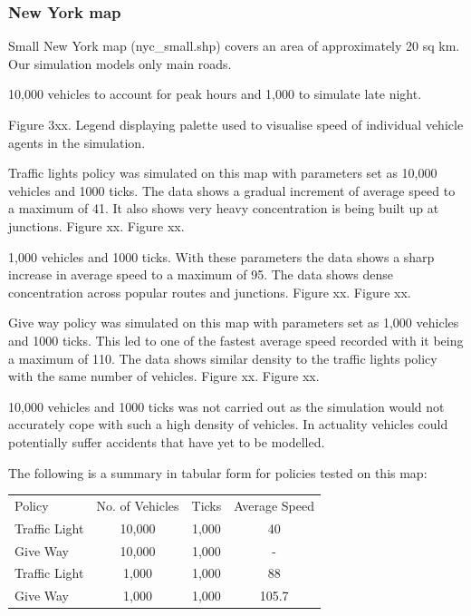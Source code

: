 \documentclass[11pt]{article}
\begin{document}
\begin{enumerate}
\subsubsection{New York map}


Small New York map (nyc\_small.shp) covers an area of approximately 20 sq km. Our simulation models only main roads. 

10,000 vehicles to account for peak hours and 1,000 to simulate late night.


Figure 3xx. Legend displaying palette used to visualise speed of individual vehicle agents in the simulation.

Traffic lights policy was simulated on this map with parameters set as 10,000 vehicles and 1000 ticks. The data shows a gradual increment of average speed to a maximum of 41. It also shows very heavy concentration is being built up at junctions.
Figure xx.
Figure xx.

1,000 vehicles and 1000 ticks. With these parameters the data shows a sharp increase in average speed to a maximum of 95. The data shows dense concentration across popular routes and junctions.
Figure xx.
Figure xx.

Give way policy was simulated on this map with parameters set as 1,000 vehicles and 1000 ticks. This led to one of the fastest average speed recorded with it being a maximum of 110. The data shows similar density to the traffic lights policy with the same number of vehicles.
Figure xx.
Figure xx.

10,000 vehicles and 1000 ticks was not carried out as the simulation would not accurately cope with such a high density of vehicles. In actuality vehicles could potentially suffer accidents that have yet to be modelled. 

The following is a summary in tabular form for policies tested on this map:


\begin{center}
\begin{tabular}{ l | c | c | c }
\hline
Policy & No. of Vehicles & Ticks & Average Speed \\
Traffic Light & 10,000 & 1,000 & 40 \\
Give Way & 10,000 & 1,000 & - \\
Traffic Light & 1,000 & 1,000 & 88 \\
Give Way & 1,000 & 1,000 & 105.7 \\
\hline
\end{tabular}
\end{center}


\end{enumerate}
\end{document}
